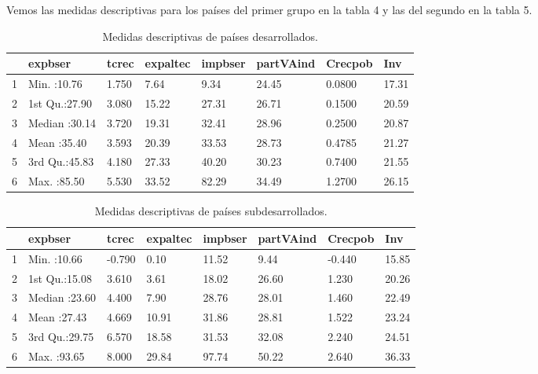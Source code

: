 \documentclass[a4paper,10pt]{article}
\begin{document}
Vemos las medidas descriptivas para los países del primer grupo en la tabla 4 y las del segundo en la tabla 5.
\begin{table}[ht]
\centering
\begin{tabular}{rlllllll}
  \hline
 &    expbser &     tcrec &    expaltec &    impbser &   partVAind &    Crecpob &      Inv \\ 
  \hline
1 & Min.   :10.76   &1.750   & 7.64   & 9.34   &24.45   &0.0800   &17.31   \\ 
  2 & 1st Qu.:27.90   & 3.080   & 15.22   & 27.31   & 26.71   & 0.1500   & 20.59   \\ 
  3 & Median :30.14   &3.720   &19.31   &32.41   &28.96   &0.2500   &20.87   \\ 
  4 & Mean   :35.40   & 3.593   & 20.39   & 33.53   & 28.73   & 0.4785   & 21.27   \\ 
  5 & 3rd Qu.:45.83   & 4.180   & 27.33   & 40.20   & 30.23   & 0.7400   & 21.55   \\ 
  6 & Max.   :85.50   &5.530   &33.52   &82.29   &34.49   &1.2700   &26.15   \\ 
   \hline
\end{tabular}
\caption{Medidas descriptivas de países desarrollados.}
\end{table}

\begin{table}[ht]
\centering
\begin{tabular}{rlllllll}
  \hline
 &    expbser &     tcrec &    expaltec &    impbser &   partVAind &    Crecpob &      Inv \\ 
  \hline
1 & Min.   :10.66   & -0.790   &  0.10   & 11.52   &  9.44   & -0.440   & 15.85   \\ 
  2 & 1st Qu.:15.08   & 3.610   & 3.61   &18.02   &26.60   & 1.230   &20.26   \\ 
  3 & Median :23.60   &  4.400   &  7.90   & 28.76   & 28.01   &  1.460   & 22.49   \\ 
  4 & Mean   :27.43   &  4.669   & 10.91   & 31.86   & 28.81   &  1.522   & 23.24   \\ 
  5 & 3rd Qu.:29.75   &  6.570   & 18.58   & 31.53   & 32.08   &  2.240   & 24.51   \\ 
  6 & Max.   :93.65   &  8.000   & 29.84   & 97.74   & 50.22   &  2.640   & 36.33   \\ 
   \hline
\end{tabular}
\caption{Medidas descriptivas de países subdesarrollados.}
\end{table}
\end{document}
